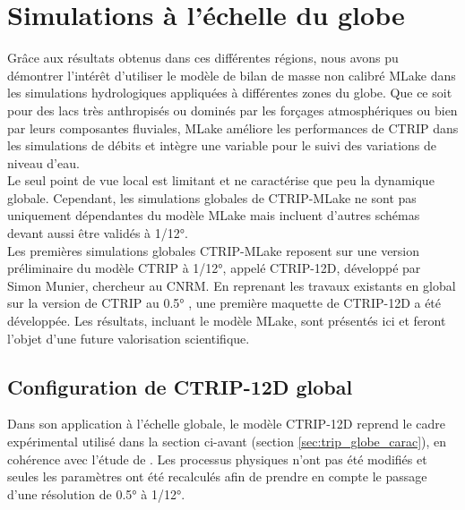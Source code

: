 \section{{\selectfont Simulations à l'échelle du globe}}

Grâce aux résultats obtenus dans ces différentes régions, nous avons pu démontrer l'intérêt d'utiliser le modèle de bilan de masse non calibré MLake dans les simulations hydrologiques appliquées à différentes zones du globe. Que ce soit pour des lacs très anthropisés ou dominés par les forçages atmosphériques ou bien par leurs composantes fluviales, MLake améliore les performances de CTRIP dans les simulations de débits et intègre une variable pour le suivi des variations de niveau d'eau. \\
Le seul point de vue local est limitant et ne caractérise que peu la dynamique globale. Cependant, les simulations globales de CTRIP-MLake ne sont pas uniquement dépendantes du modèle MLake mais incluent d'autres schémas devant aussi être validés à 1/12°.\\

Les premières simulations globales CTRIP-MLake reposent sur une version préliminaire du modèle CTRIP à 1/12°, appelé CTRIP-12D, développé par Simon Munier, chercheur au CNRM. En reprenant les travaux existants en global sur la version de CTRIP au 0.5° \citep{decharme2019}, une première maquette de CTRIP-12D a été développée. Les résultats, incluant le modèle MLake, sont présentés ici et feront l'objet d'une future valorisation scientifique.

\subsection{{\selectfont Configuration de CTRIP-12D global}}

Dans son application à l'échelle globale, le modèle CTRIP-12D reprend le cadre expérimental utilisé dans la section ci-avant (section \ref{sec:trip_globe_carac}), en cohérence avec l'étude de \citet{decharme2019}. Les processus physiques n'ont pas été modifiés et seules les paramètres ont été recalculés afin de prendre en compte le passage d'une résolution de 0.5° à 1/12°.\\

